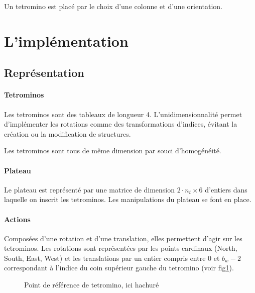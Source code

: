 \documentclass{report}
\begin{document}
Un tetromino est placé par le choix d'une colonne et d'une orientation.

\section{L'implémentation}

\subsection{Représentation}

\paragraph{Tetrominos}
Les tetrominos sont des tableaux de longueur 4. L'unidimensionnalité permet
d'implémenter les rotations comme des transformations d'indices, évitant la
création ou la modification de structures.

Les tetrominos sont tous de même dimension par souci d'homogénéité.

\paragraph{Plateau}
Le plateau est représenté par une matrice de dimension
\(2\cdot n_t \times 6\) d'entiers dans laquelle on inscrit les tetrominos. Les
manipulations du plateau se font en place.


\paragraph{Actions}
Composées d'une rotation et d'une translation, elles permettent d'agir sur les
tetrominos. Les rotations sont représentées par les points cardinaux
(North, South, East, West) et les translations par un entier compris entre 0 et
\(b_w - 2\) correspondant à l'indice du coin supérieur gauche du tetromino
(voir fig\ref{fig:tetref}).

\begin{figure}[h]
  \centering
  \qquad
  \caption{Point de référence de tetromino, ici hachuré}\label{fig:tetref}
\end{figure}
\end{document}
